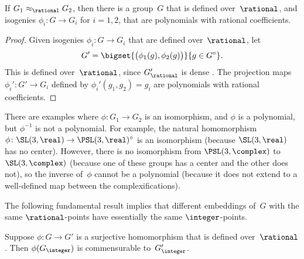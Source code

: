\begin{prop} \label{isog/Q->poly}
 If $G_1 \approx_\rational G_2$, then there is a group~$G$ that is defined
over\/~$\rational$, and isogenies $\phi_i \colon G
\to G_i$ for $i = 1,2$, that are polynomials with rational coefficients.
 \end{prop}

\begin{proof}
 Given isogenies $\phi_i \colon G \to G_i$ that are defined
over~$\rational$, let 
	 $$G' =
	 \bigset{ \bigl( \phi_1(g), \phi_2(g) \bigr) 
	 }{ 
	 g \in G^\circ }
	 .$$
This is defined over~$\rational$, since $G'_\rational$ is dense . The projection maps $\phi_i' \colon G' \to G_i$
defined by $\phi_i'(g_1,g_2) = g_i$ are polynomials with rational coefficients.
 \end{proof}

\begin{warn}
 There are examples where $\phi \colon G_1 \to G_2$ is an
isomorphism, and $\phi$ is a polynomial, but
$\phi^{-1}$ is not a polynomial. For example, the natural
homomorphism $\phi \colon \SL(3,\real) \to
\PSL(3,\real)^\circ$ is an isomorphism (because
$\SL(3,\real)$ has no center). However, there is no
isomorphism from $\PSL(3,\complex)$ to $\SL(3,\complex)$
(because one of these groups has a center and the other does
not), so the inverse of~$\phi$ cannot be a polynomial
(because it does not extend to a well-defined map between the
complexifications).
 \end{warn}

The following fundamental result implies that different
embeddings of~$G$ with the same $\rational$-points have
essentially the same $\integer$-points.

\begin{prop} \label{phi(GZ)}
 Suppose $\phi \colon G \to G'$ is a surjective homomorphism
that is defined over~$\rational$. Then $\phi (G_\integer)$ is
commensurable to~$G'_\integer$.
 \end{prop}

